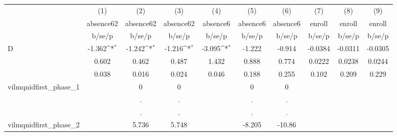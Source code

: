 {
\def\sym#1{\ifmmode^{#1}\else\(^{#1}\)\fi}
\begin{tabular}{l*{9}{c}}
\hline\hline
            &\multicolumn{1}{c}{(1)}&\multicolumn{1}{c}{(2)}&\multicolumn{1}{c}{(3)}&\multicolumn{1}{c}{(4)}&\multicolumn{1}{c}{(5)}&\multicolumn{1}{c}{(6)}&\multicolumn{1}{c}{(7)}&\multicolumn{1}{c}{(8)}&\multicolumn{1}{c}{(9)}\\
            &\multicolumn{1}{c}{absence62}&\multicolumn{1}{c}{absence62}&\multicolumn{1}{c}{absence62}&\multicolumn{1}{c}{absence6}&\multicolumn{1}{c}{absence6}&\multicolumn{1}{c}{absence6}&\multicolumn{1}{c}{enroll}&\multicolumn{1}{c}{enroll}&\multicolumn{1}{c}{enroll}\\
            &      b/se/p         &      b/se/p         &      b/se/p         &      b/se/p         &      b/se/p         &      b/se/p         &      b/se/p         &      b/se/p         &      b/se/p         \\
\hline
D           &      -1.362\sym{*}  &      -1.242\sym{*}  &      -1.216\sym{*}  &      -3.095\sym{*}  &      -1.222         &      -0.914         &     -0.0384         &     -0.0311         &     -0.0305         \\
            &       0.602         &       0.462         &       0.487         &       1.432         &       0.888         &       0.774         &      0.0222         &      0.0238         &      0.0244         \\
            &       0.038         &       0.016         &       0.024         &       0.046         &       0.188         &       0.255         &       0.102         &       0.209         &       0.229         \\
vilmqnidfirst\_phase\_1&                     &           0         &           0         &                     &           0         &           0         &                     &                     &                     \\
            &                     &           .         &           .         &                     &           .         &           .         &                     &                     &                     \\
            &                     &           .         &           .         &                     &           .         &           .         &                     &                     &                     \\
vilmqnidfirst\_phase\_2&                     &       5.736         &       5.748         &                     &      -8.205         &      -10.86         &                     &                     &                     \\

\end{tabular}}
